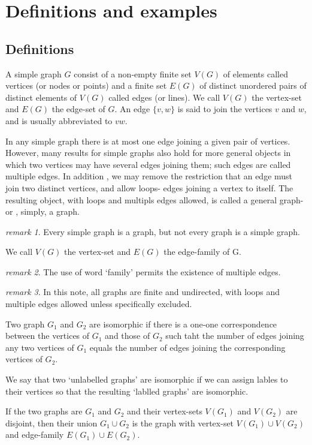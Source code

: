 \documentclass[a4paper,11pt]{article}%
\theoremstyle{remark}
\newtheorem*{remark}{remark}
\theoremstyle{definition}
\theoremstyle{definition}
\theoremstyle{definition}
\theoremstyle{definition}
\theoremstyle{plain}
\theoremstyle{definition}
\begin{document}
\section{Definitions and examples}
\subsection{Definitions}
A simple graph $G$ consist of a non-empty finite set $V(G)$ of elements called 
vertices (or nodes or points) and a finite set $E(G)$ of distinct unordered 
pairs of distinct elements of $V(G)$ called edges (or lines). We call $V(G)$
the vertex-set and $E(G)$ the edge-set of $G$. An edge $\{v,w\}$ is 
said to join the vertices $v$ and $w$, and is usually abbreviated to $vw$.

In any simple graph there is at most one edge joining a given pair of vertices.
However, many results for simple graphs also hold for  more general objects
in which two vertices may have several edges joining them; such edges are called multiple
edges. In addition , we may remove the restriction that an edge must join 
two distinct vertices, and allow loops- edges joining a vertex to itself.
The resulting object, with loops and multipls edges allowed, is called a general 
graph- or , simply, a graph.
\begin{remark}
    Every simple graph is a graph, but not every graph is a simple graph.
\end{remark}
We call $V(G)$ the vertex-set and $E(G)$ the edge-family of G.
\begin{remark}
    The use of word `family' permits the existence of multiple edges.
\end{remark}
\begin{remark}
    In this note, all graphs are finite and undirected, with loops 
    and multiple edges allowed unless specifically excluded.
\end{remark}

Two graph $G_1$ and $G_2$ are isomorphic if there is a one-one 
correspondence between the vertices of $G_1$ and those of $G_2$ 
such taht the number of edges joining any two vertices of $G_1$ equals
the number of edges joining the corresponding vertices of $G_2$.

We say that two `unlabelled graphs' are isomorphic if we can assign lables to 
their vertices so that the resulting `lablled graphs' are isomorphic.

If the two graphs are $G_1$ and $G_2$ and their vertex-sets $V(G_1)$ and $V(G_2)$
are disjoint, then their union $G_1\cup G_2$ is the graph with vertex-set $V(G_1)\cup V(G_2)$
and edge-family $E(G_1)\cup E(G_2)$.
\end{document}
